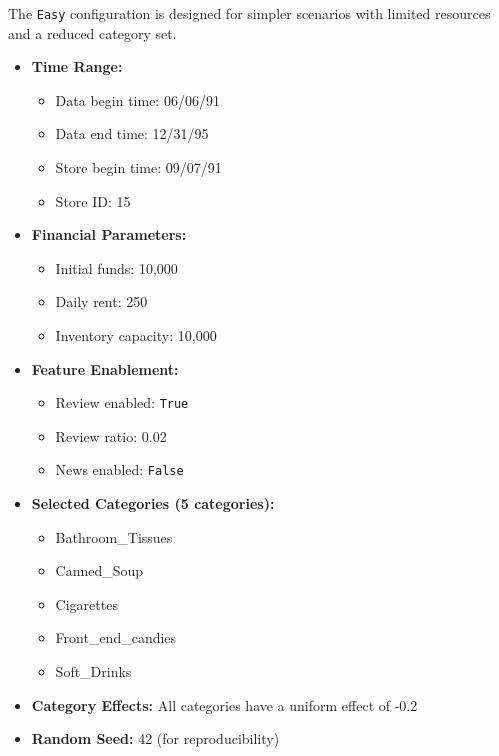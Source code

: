The \texttt{Easy} configuration is designed for simpler scenarios with limited resources and a reduced category set.

\begin{itemize}
    \item \textbf{Time Range:}
    \begin{itemize}
        \item Data begin time: 06/06/91
        \item Data end time: 12/31/95
        \item Store begin time: 09/07/91
        \item Store ID: 15
    \end{itemize}
    
    \item \textbf{Financial Parameters:}
    \begin{itemize}
        \item Initial funds: 10,000
        \item Daily rent: 250
        \item Inventory capacity: 10,000
    \end{itemize}
    
    \item \textbf{Feature Enablement:}
    \begin{itemize}
        \item Review enabled: \texttt{True}
        \item Review ratio: 0.02
        \item News enabled: \texttt{False}
    \end{itemize}
    
    \item \textbf{Selected Categories (5 categories):}
    \begin{itemize}
        \item Bathroom\_Tissues
        \item Canned\_Soup
        \item Cigarettes
        \item Front\_end\_candies
        \item Soft\_Drinks
    \end{itemize}
    
    \item \textbf{Category Effects:} All categories have a uniform effect of -0.2
    
    \item \textbf{Random Seed:} 42 (for reproducibility)
\end{itemize}

